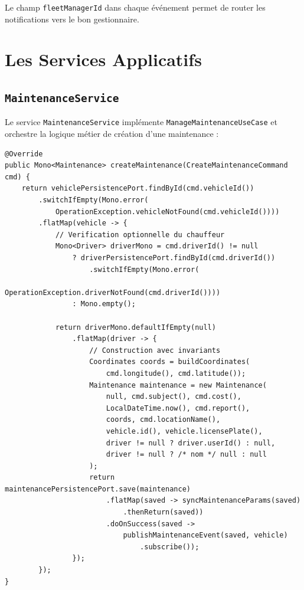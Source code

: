 \documentclass[12pt,a4paper]{report}
\begin{document}
Le champ \texttt{fleetManagerId} dans chaque événement permet de router les notifications vers le bon gestionnaire.

\section{Les Services Applicatifs}

\subsection{\texttt{MaintenanceService}}

Le service \texttt{MaintenanceService} implémente \texttt{ManageMaintenanceUseCase} et orchestre la logique métier de création d'une maintenance :

\begin{lstlisting}[style=javaStyle, caption={Logique de création d'une maintenance}]
@Override
public Mono<Maintenance> createMaintenance(CreateMaintenanceCommand cmd) {
    return vehiclePersistencePort.findById(cmd.vehicleId())
        .switchIfEmpty(Mono.error(
            OperationException.vehicleNotFound(cmd.vehicleId())))
        .flatMap(vehicle -> {
            // Verification optionnelle du chauffeur
            Mono<Driver> driverMono = cmd.driverId() != null
                ? driverPersistencePort.findById(cmd.driverId())
                    .switchIfEmpty(Mono.error(
                        OperationException.driverNotFound(cmd.driverId())))
                : Mono.empty();

            return driverMono.defaultIfEmpty(null)
                .flatMap(driver -> {
                    // Construction avec invariants
                    Coordinates coords = buildCoordinates(
                        cmd.longitude(), cmd.latitude());
                    Maintenance maintenance = new Maintenance(
                        null, cmd.subject(), cmd.cost(),
                        LocalDateTime.now(), cmd.report(),
                        coords, cmd.locationName(),
                        vehicle.id(), vehicle.licensePlate(),
                        driver != null ? driver.userId() : null,
                        driver != null ? /* nom */ null : null
                    );
                    return maintenancePersistencePort.save(maintenance)
                        .flatMap(saved -> syncMaintenanceParams(saved)
                            .thenReturn(saved))
                        .doOnSuccess(saved ->
                            publishMaintenanceEvent(saved, vehicle)
                                .subscribe());
                });
        });
}
\end{lstlisting}
\end{document}
